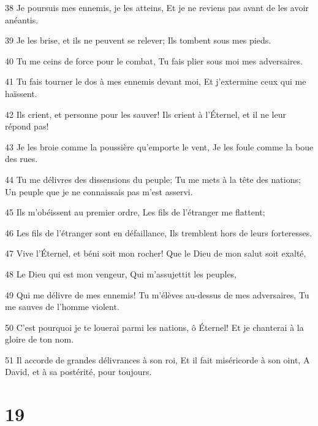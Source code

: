 \par 38 Je poursuis mes ennemis, je les atteins, Et je ne reviens pas avant de les avoir anéantis.
\par 39 Je les brise, et ils ne peuvent se relever; Ils tombent sous mes pieds.
\par 40 Tu me ceins de force pour le combat, Tu fais plier sous moi mes adversaires.
\par 41 Tu fais tourner le dos à mes ennemis devant moi, Et j'extermine ceux qui me haïssent.
\par 42 Ils crient, et personne pour les sauver! Ils crient à l'Éternel, et il ne leur répond pas!
\par 43 Je les broie comme la poussière qu'emporte le vent, Je les foule comme la boue des rues.
\par 44 Tu me délivres des dissensions du peuple; Tu me mets à la tête des nations; Un peuple que je ne connaissais pas m'est asservi.
\par 45 Ils m'obéissent au premier ordre, Les fils de l'étranger me flattent;
\par 46 Les fils de l'étranger sont en défaillance, Ils tremblent hors de leurs forteresses.
\par 47 Vive l'Éternel, et béni soit mon rocher! Que le Dieu de mon salut soit exalté,
\par 48 Le Dieu qui est mon vengeur, Qui m'assujettit les peuples,
\par 49 Qui me délivre de mes ennemis! Tu m'élèves au-dessus de mes adversaires, Tu me sauves de l'homme violent.
\par 50 C'est pourquoi je te louerai parmi les nations, ô Éternel! Et je chanterai à la gloire de ton nom.
\par 51 Il accorde de grandes délivrances à son roi, Et il fait miséricorde à son oint, A David, et à sa postérité, pour toujours.

\chapter{19}

